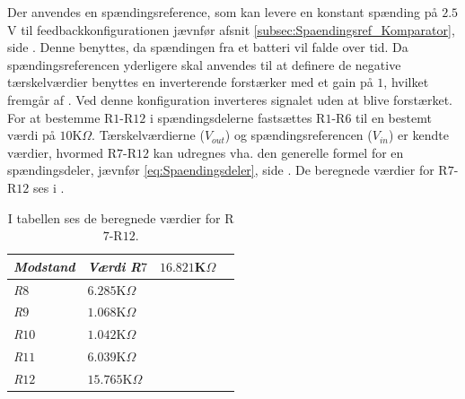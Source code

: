 \noindent Der anvendes en spændingsreference, som kan levere en konstant spænding på $2.5$V til feedbackkonfigurationen jævnfør afsnit \ref{subsec:Spaendingsref_Komparator}, side \pageref{subsec:Spaendingsref_Komparator}. Denne benyttes, da spændingen fra et batteri vil falde over tid. 
Da spændingsreferencen yderligere skal anvendes til at definere de negative tærskelværdier benyttes en inverterende forstærker med et gain på $1$, hvilket fremgår af . Ved denne konfiguration inverteres signalet uden at blive forstærket. \\
For at bestemme R$1$-R$12$ i spændingsdelerne fastsættes R$1$-R$6$ til en bestemt værdi på $10$K$\Omega$. Tærskelværdierne ($V_{out}$) og spændingsreferencen ($V_{in}$) er kendte værdier, hvormed R$7$-R$12$ kan udregnes vha. den generelle formel for en spændingsdeler, jævnfør \eqref{eq:Spaendingsdeler}, side \pageref{subsec:Spaendingsref}. De beregnede værdier for R$7$-R$12$ ses i .
\begin{table}[H]
	\centering
	\begin{tabular}{|l|l|l|l|} \hline
		\textit{Modstand} & \textit{Værdi}
	\textit{R$7$} & $16.821$K$\Omega$ \\ \hline
	\textit{R$8$} & $6.285$K$\Omega$ \\ \hline
	\textit{R$9$} & $1.068$K$\Omega$ \\ \hline
	\textit{R$10$} & $1.042$K$\Omega$ \\ \hline
	\textit{R$11$} & $6.039$K$\Omega$ \\ \hline
	\textit{R$12$} & $15.765$K$\Omega$ \\ \hline    
	\end{tabular}
	\caption{I tabellen ses de beregnede værdier for R$7$-R$12$.}
	\label{tab:modtande_R7-R12}
\end{table}


